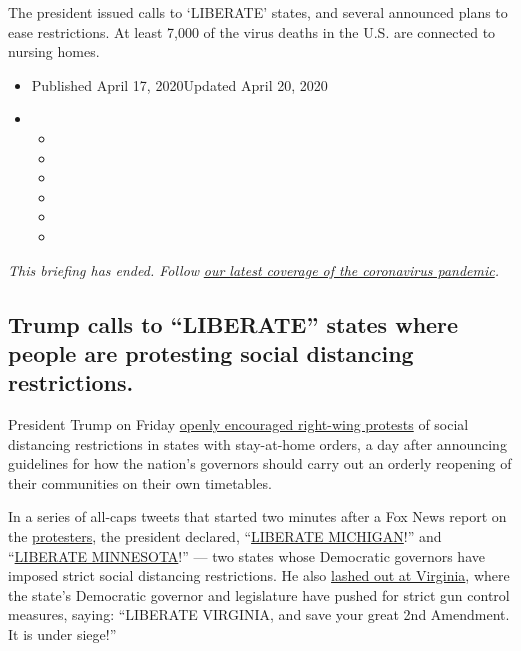 The president issued calls to `LIBERATE' states, and several announced
plans to ease restrictions. At least 7,000 of the virus deaths in the
U.S. are connected to nursing homes.

\begin{itemize}
\item
  Published April 17, 2020Updated April 20, 2020
\item
  \begin{itemize}
  \item
  \item
  \item
  \item
  \item
  \item
  \end{itemize}
\end{itemize}

\emph{This briefing has ended. Follow}
\href{https://www.nytimes3xbfgragh.onion/2020/04/18/us/coronavirus-updates.html}{\emph{our
latest coverage of the coronavirus pandemic}}\emph{.}

\hypertarget{trump-calls-to-liberate-states-where-people-are-protesting-social-distancing-restrictions}{%
\subsection{Trump calls to ``LIBERATE'' states where people are
protesting social distancing
restrictions.}\label{trump-calls-to-liberate-states-where-people-are-protesting-social-distancing-restrictions}}

President Trump on Friday
\href{https://www.nytimes3xbfgragh.onion/2020/04/17/us/politics/trump-coronavirus-governors.html}{openly
encouraged right-wing protests} of social distancing restrictions in
states with stay-at-home orders, a day after announcing guidelines for
how the nation's governors should carry out an orderly reopening of
their communities on their own timetables.

In a series of all-caps tweets that started two minutes after a Fox News
report on the
\href{https://www.nytimes3xbfgragh.onion/2020/04/20/us/politics/trump-coronavirus.html}{protesters},
the president declared,
``\href{https://twitter.com/realDonaldTrump/status/1251169217531056130}{LIBERATE
MICHIGAN}!'' and
``\href{https://twitter.com/realDonaldTrump/status/1251168994066944003}{LIBERATE
MINNESOTA}!'' --- two states whose Democratic governors have imposed
strict social distancing restrictions. He also
\href{https://twitter.com/realDonaldTrump/status/1251169987110330372}{lashed
out at Virginia}, where the state's Democratic governor and legislature
have pushed for strict gun control measures, saying: ``LIBERATE
VIRGINIA, and save your great 2nd Amendment. It is under siege!''

